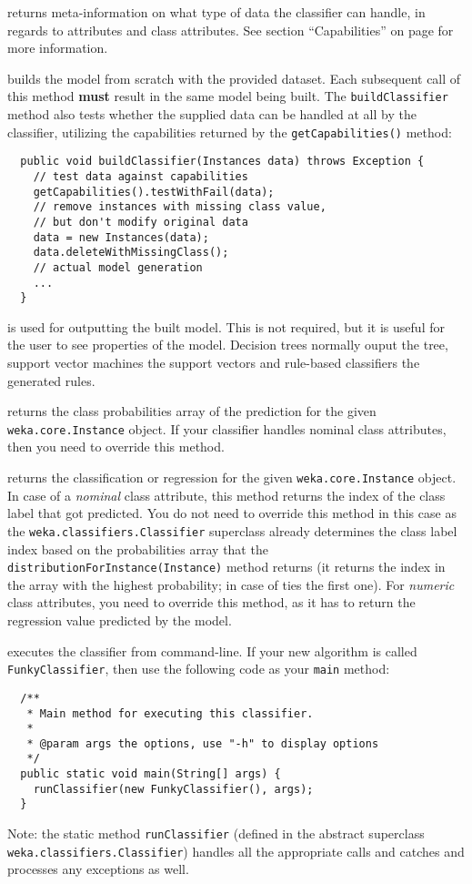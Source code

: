  returns meta-information on what type of data the
classifier can handle, in regards to attributes and class attributes. See
section ``Capabilities'' on page \pageref{classifier_capabilities} for more
information.

 builds the model from scratch with the
provided dataset. Each subsequent call of this method \textbf{must} result in
the same model being built. The \texttt{buildClassifier} method also tests
whether the supplied data can be handled at all by the classifier, utilizing
the capabilities returned by the \texttt{getCapabilities()} method:
\begin{verbatim}
  public void buildClassifier(Instances data) throws Exception {
    // test data against capabilities
    getCapabilities().testWithFail(data);
    // remove instances with missing class value,
    // but don't modify original data
    data = new Instances(data);
    data.deleteWithMissingClass();
    // actual model generation
    ...
  }
\end{verbatim}

 is used for outputting the built model. This is not
required, but it is useful for the user to see properties of the model. Decision
trees normally ouput the tree, support vector machines the support vectors and
rule-based classifiers the generated rules.

 returns the class probabilities
array of the prediction for the given \texttt{weka.core.Instance} object. If
your classifier handles nominal class attributes, then you need to override
this method.

 returns the classification or regression
for the given \texttt{weka.core.Instance} object. In case of a \textit{nominal}
class attribute, this method returns the index of the class label that got
predicted. You do not need to override this method in this case as the
\texttt{weka.classifiers.Classifier} superclass already determines the class
label index based on the probabilities array that the
\texttt{distributionForInstance(Instance)} method returns (it returns the index
in the array with the highest probability; in case of ties the first one). For
\textit{numeric} class attributes, you need to override this method, as it
has to return the regression value predicted by the model.

 executes the classifier from command-line. If your
new algorithm is called \texttt{FunkyClassifier}, then use the following code
as your \texttt{main} method:
\begin{verbatim}
  /**
   * Main method for executing this classifier.
   *
   * @param args the options, use "-h" to display options
   */
  public static void main(String[] args) {
    runClassifier(new FunkyClassifier(), args);
  }
\end{verbatim}
Note: the static method \texttt{runClassifier} (defined in the abstract
superclass \texttt{weka.classifiers.Classifier}) handles all the appropriate
calls and catches and processes any exceptions as well.

